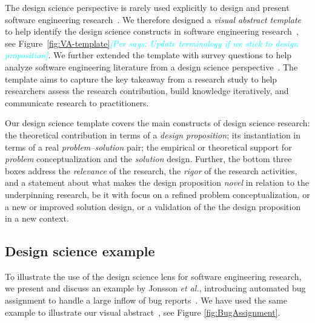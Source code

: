 \documentclass[graybox]{svmult}
\newcommand{\per}[1]{\textcolor{cyan}{{\it [Per says: #1]}}}
\newcommand{\per}[1]{}
\begin{document}
The design science perspective is rarely used explicitly to design and present software engineering research~\cite{Engstrom19arxiv}. We therefore designed a \emph{visual abstract template} to help identify the design science constructs in software engineering research~\cite{StoreyESEM17}, see Figure~\ref{fig:VA-template}\per{Update terminology if we stick to design proposition}. We further extended the template with survey questions to help analyze software engineering literature from a design science perspective~\cite{Engstrom19arxiv}. The template aims to capture the key takeaway from a research study to help researchers assess the research contribution, build knowledge iteratively, and communicate research to practitioners. %

Our design science template covers the main constructs of design science research: the theoretical contribution in terms of a \emph{design proposition}; its instantiation in terms of a real \emph{problem--solution} pair; the empirical or theoretical support for \emph{problem} conceptualization and the \emph{solution} design. Further, the bottom three boxes address the \emph{relevance} of the research, the \emph{rigor} of the research activities, and a statement about what makes the design proposition \emph{novel} in relation to the underpinning research, be it with focus on a refined problem conceptualization, or a new or improved solution design, or a validation of the the design proposition in a new context. 



\subsection{Design science example}
\label{sec:examples}
To illustrate the use of the design science lens for software engineering research, we present and discuss an example by Jonsson \emph{et al.}, introducing automated bug assignment to handle a large inflow of bug reports~\cite{JonssonBug15}. We have used the same example to illustrate our visual abstract~\cite{StoreyESEM17}, see Figure \ref{fig:BugAssignment}.
\end{document}
